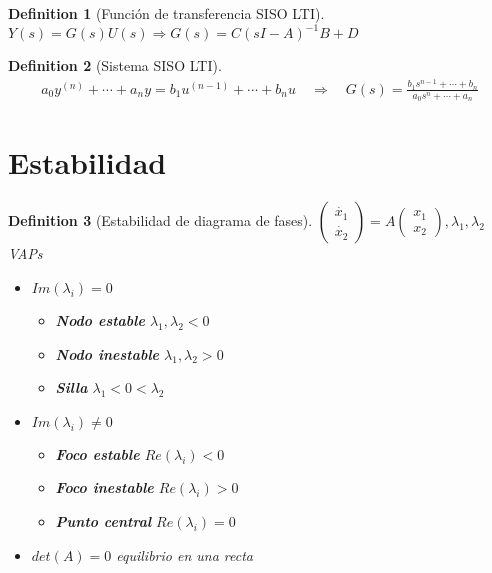\documentclass[leqno]{article}
\newtheorem*{definition}{Definition}
\begin{document}
\begin{definition}[Función de transferencia SISO LTI]  $Y(s)=G(s)U(s) \Rightarrow G(s) = C(sI-A)^{-1}B + D $
\end{definition}

\begin{definition}[Sistema SISO LTI]
  \begin{align*}
    a_0y^{(n)} + \cdots + a_ny = b_1 u^{(n-1)} + \cdots + b_n u \quad \Rightarrow \quad G(s)= \frac{b_1s ^{n-1} + \cdots+ b_n}{a_0s^n + \cdots + a_n}
  \end{align*}

\end{definition}

\section{Estabilidad}

\begin{definition}[Estabilidad de diagrama de fases] $\begin{pmatrix} \dot{x_1} \\ \dot{x_2}  \end{pmatrix} = A \begin{pmatrix} x_1\\x_2 \end{pmatrix}, \lambda_1, \lambda_2  $ VAPs
\begin{itemize}[topsep=-6pt, itemsep=0pt]
  \item $Im(\lambda_i)=0$
	\begin{itemize}[topsep=-6pt, itemsep=0pt]
	  \item \textbf{Nodo estable} $\lambda_1, \lambda_2<0$
	  \item  \textbf{Nodo inestable} $\lambda_1, \lambda_2>0$
	  \item  \textbf{Silla} $\lambda_1<0<\lambda_2$
	\end{itemize}
  \item $Im(\lambda_i) \neq 0$
	\begin{itemize}[topsep=-6pt, itemsep=0pt]
	  \item   \textbf{Foco estable} $Re(\lambda_i)<0$
	  \item   \textbf{Foco inestable} $Re(\lambda_i)>0$ 
	  \item \textbf{Punto central} $Re(\lambda_i)=0$
	\end{itemize}
  \item $det(A)=0$ equilibrio en una recta
\end{itemize}
\end{definition}
\end{document}
